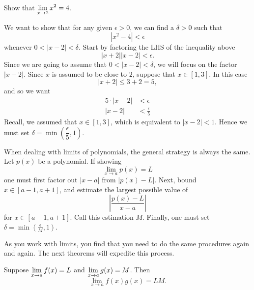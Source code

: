 \begin{example} Show that $\displaystyle \lim_{x\to 2} x^2=4$.

\begin{solution}
We want to show that for any given $\epsilon>0$, we can find a
$\delta>0$ such that
\[
|x^2 -4|<\epsilon
\]
whenever $0<|x - 2|<\delta$. Start by factoring the LHS of the inequality above
\[
|x+2||x-2|<\epsilon.
\]
Since we are going to assume that $0<|x - 2|<\delta$, we will focus on
the factor $|x+2|$. Since $x$ is assumed to be close to $2$, suppose that $x\in[1,3]$. In this case
\[
|x+2| \le 3+2 = 5,
\]
and so we want
\begin{align*}
5\cdot |x-2| &< \epsilon\\
|x-2| &< \frac{\epsilon}{5}
\end{align*}
Recall, we assumed that $x\in[1,3]$, which is equivalent to
$|x-2|<1$. Hence we must set $\delta = \min\left(\dfrac{\epsilon}{5},1\right)$.
\end{solution}
\end{example}

When dealing with limits of polynomials, the general strategy is
always the same. Let $p(x)$ be a polynomial. If showing
\[
\lim_{x\to a} p(x) = L
\]
one must first factor out $|x-a|$ from $|p(x) - L|$. Next, bound $x\in
[a-1,a+1]$, and estimate the largest possible value of
\[
\left|\frac{p(x) -L}{x-a}\right|
\]
for $x\in[a-1,a+1]$. Call this estimation $M$. Finally, one must set
$\delta = \min\left(\frac{\epsilon}{M}, 1\right)$.

As you work with limits, you find that you need to do the same
procedures again and again. The next theorems will expedite this
process.
\begin{theorem} 
Suppose $\displaystyle \lim_{x\to a} f(x)=L$ and $\displaystyle \lim_{x\to a}g(x)=M$. Then
\[
\lim_{x\to a} f(x)g(x) = LM.
\]
\end{theorem}


